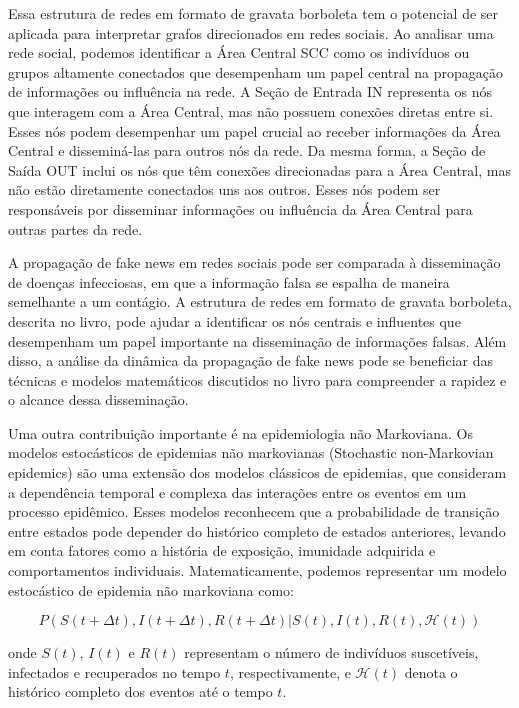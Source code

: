 Essa estrutura de redes em formato de gravata borboleta tem o potencial de ser aplicada para interpretar grafos direcionados em redes sociais. Ao analisar uma rede social, podemos identificar a Área Central {SCC} como os indivíduos ou grupos altamente conectados que desempenham um papel central na propagação de informações ou influência na rede. A Seção de Entrada {IN} representa os nós que interagem com a Área Central, mas não possuem conexões diretas entre si. Esses nós podem desempenhar um papel crucial ao receber informações da Área Central e disseminá-las para outros nós da rede. Da mesma forma, a Seção de Saída {OUT} inclui os nós que têm conexões direcionadas para a Área Central, mas não estão diretamente conectados uns aos outros. Esses nós podem ser responsáveis por disseminar informações ou influência da Área Central para outras partes da rede.

A propagação de fake news em redes sociais pode ser comparada à disseminação de doenças infecciosas, em que a informação falsa se espalha de maneira semelhante a um contágio. A estrutura de redes em formato de gravata borboleta, descrita no livro, pode ajudar a identificar os nós centrais e influentes que desempenham um papel importante na disseminação de informações falsas. Além disso, a análise da dinâmica da propagação de fake news pode se beneficiar das técnicas e modelos matemáticos discutidos no livro para compreender a rapidez e o alcance dessa disseminação.

Uma outra contribuição importante é na epidemiologia não Markoviana. Os modelos estocásticos de epidemias não markovianas (Stochastic non-Markovian epidemics) são uma extensão dos modelos clássicos de epidemias, que consideram a dependência temporal e complexa das interações entre os eventos em um processo epidêmico. Esses modelos reconhecem que a probabilidade de transição entre estados pode depender do histórico completo de estados anteriores, levando em conta fatores como a história de exposição, imunidade adquirida e comportamentos individuais. Matematicamente, podemos representar um modelo estocástico de epidemia não markoviana como:

\begin{equation}
P(S(t+\Delta t), I(t+\Delta t), R(t+\Delta t)|S(t), I(t), R(t), \mathcal{H}(t))
\end{equation}

onde $S(t)$, $I(t)$ e $R(t)$ representam o número de indivíduos suscetíveis, infectados e recuperados no tempo $t$, respectivamente, e $\mathcal{H}(t)$ denota o histórico completo dos eventos até o tempo $t$.

